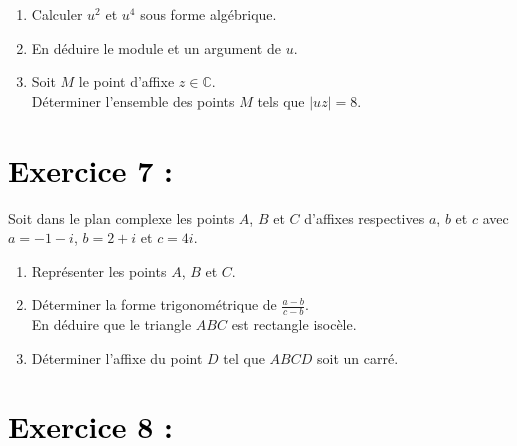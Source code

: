 \documentclass[12pt]{article}
\begin{document}
\begin{enumerate}
    \item Calculer $u^2$ et $u^4$ sous forme algébrique.
    \item En déduire le module et un argument de $u$.
    \item Soit $M$ le point d’affixe $z \in \mathbb{C}$.\\ Déterminer l’ensemble des points $M$ tels que $|uz| = 8$.
\end{enumerate}
\section*{\textcolor{black}{Exercice 7 :}}

Soit dans le plan complexe les points $A$, $B$ et $C$ d’affixes respectives $a$, $b$ et $c$ avec $a = -1 - i$, $b = 2 + i$ et $c = 4i$.

\begin{enumerate}
    \item Représenter les points $A$, $B$ et $C$.
    \item Déterminer la forme trigonométrique de $\frac{a - b}{c - b}$.\\  
    En déduire que le triangle $ABC$ est rectangle isocèle.
    \item Déterminer l’affixe du point $D$ tel que $ABCD$ soit un carré.
\end{enumerate}

\section*{\textcolor{black}{Exercice 8 :}}
\end{document}
